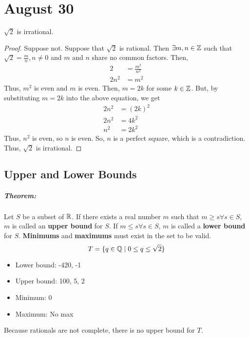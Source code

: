 \chapter{August 30}

\begin{theorem}{}{}
    $\sqrt{2}$ is irrational.
\end{theorem}
\begin{proof}
    Suppose not. Suppose that $\sqrt{2}$ is rational. Then $\exists m, n \in \mathbb{Z}$ such that $\sqrt{2} = \frac{m}{n}, n \neq 0$ and $m$ and $n$ share no common factors. Then,
    \begin{align*}
        2 &= \frac{m^2}{n^2} \\
        2n^2 &= m^2
    \end{align*}
    Thus, $m^2$ is even and $m$ is even. Then, $m = 2k$ for some $k \in \mathbb{Z}$. But, by substituting $m = 2k$ into the above equation, we get
    \begin{align*}
        2n^2 &= (2k)^2 \\
        2n^2 &= 4k^2 \\
        n^2 &= 2k^2
    \end{align*}
    Thus, $n^2$ is even, so $n$ is even. So, $n$ is a perfect square, which is a contradiction. Thus, $\sqrt{2}$ is irrational.
\end{proof}

\section{Upper and Lower Bounds}
\paragraph{Theorem:} Let $S$ be a subset of $\mathbb{R}$. If there exists a real number $m$ such that $m \geq s \forall s \in S$, $m$ is called an \textbf{upper bound} for $S$. If $m \leq s \forall s \in S$, $m$ is called a \textbf{lower bound} for $S$. \textbf{Minimums} and \textbf{maximums} must exist in the set to be valid.
$$T = \{q \in \mathbb{Q} \mid 0 \leq q \leq \sqrt{2}\}$$
\begin{itemize}
    \item Lower bound: -420, -1
    \item Upper bound: 100, 5, 2
    \item Minimum: 0
    \item Maximum: No max
\end{itemize}
Because rationals are not complete, there is no upper bound for $T$.

